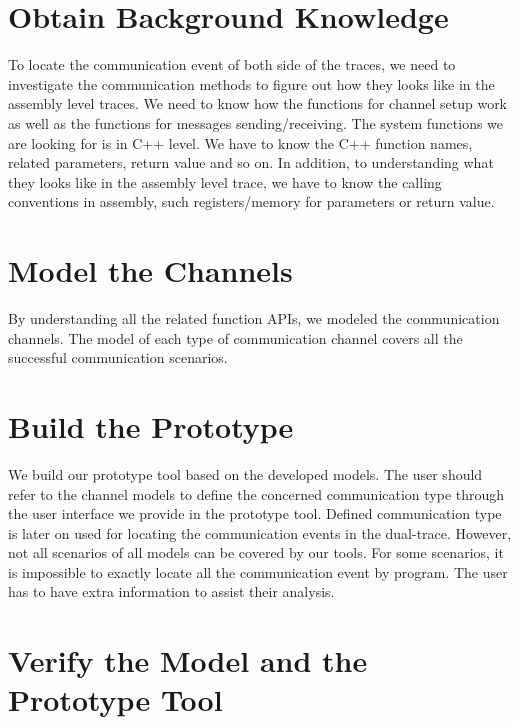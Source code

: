 \section{Obtain Background Knowledge}
To locate the communication event of both side of the traces, we need to investigate the communication methods to figure out how they looks like in the assembly level traces. We need to know how the functions for channel setup work as well as the functions for messages sending/receiving. The system functions we are looking for is in C++ level. We have to know the C++ function names, related parameters, return value and so on.  In addition, to understanding what they looks like in the assembly level trace, we have to know the calling conventions in assembly, such registers/memory for parameters or return value.

\section{Model the Channels}
By understanding all the related function APIs, we modeled the communication channels. The model of each type of communication channel covers all the successful communication scenarios.
\section{Build the Prototype}
We build our prototype tool based on the developed models. The user should refer to the channel models to define the concerned communication type through the user interface we provide in the prototype tool. Defined communication type is later on used for locating the communication events in the dual-trace. However, not all scenarios of all models can be covered by our tools. For some scenarios, it is impossible to exactly locate all the communication event by program. The user has to have extra information to assist their analysis.

\section{Verify the Model and the Prototype Tool}


\setlength{\unitlength}{\savedunitlength}

